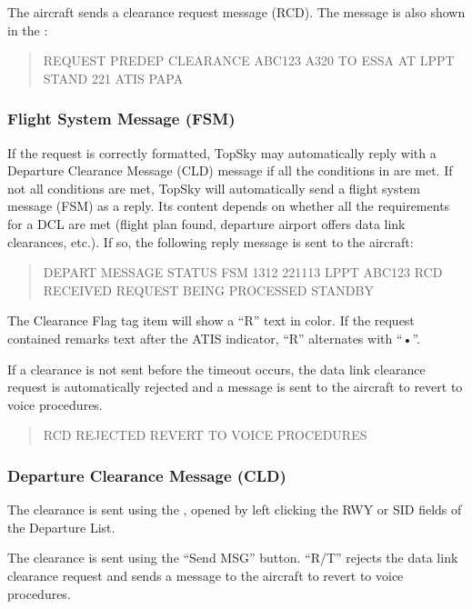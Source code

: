 \documentclass[a4paper,oneside,11pt]{memoir}
\begin{document}
The aircraft sends a clearance request message (RCD). The message is also shown in the :

\begin{quote}
  REQUEST PREDEP CLEARANCE ABC123 A320 TO ESSA AT LPPT STAND 221 ATIS PAPA
\end{quote}

\subsubsection{Flight System Message (FSM)}

If the request is correctly formatted, TopSky may automatically reply with a Departure Clearance Message (CLD) message if all the conditions in  are met. If not all conditions are met, TopSky will automatically send a flight system message (FSM) as a reply. Its content depends on whether all the requirements for a DCL are met (flight plan found, departure airport offers data link clearances, etc.). If so, the following reply message is sent to the aircraft:

\begin{quote}
  DEPART MESSAGE STATUS FSM 1312 221113 LPPT ABC123 RCD RECEIVED REQUEST BEING PROCESSED STANDBY 
\end{quote}

The Clearance Flag tag item will show a “R” text in  color. If the request contained remarks text after the ATIS indicator, “R” alternates with “•”.

\bigskip

If a clearance is not sent before the timeout occurs, the data link clearance request is automatically rejected and a message is sent to the aircraft to revert to voice procedures.

\begin{quote}
  RCD REJECTED REVERT TO VOICE PROCEDURES
\end{quote}

\subsubsection{Departure Clearance Message (CLD)}

The clearance is sent using the , opened by left clicking the RWY or SID fields of the Departure List. 

The clearance is sent using the “Send MSG” button. “R/T” rejects the data link clearance request and sends a message to the aircraft to revert to voice procedures. 
\end{document}

